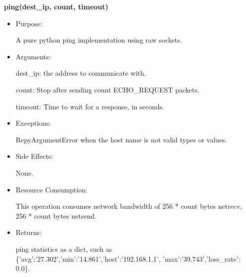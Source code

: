 \textbf{ping(dest\_ip, count, timeout)}
\begin{itemize}
\item Purpose:

A pure python ping implementation using raw sockets.

\item Arguments:

dest\_ip: the address to communicate with.

count: Stop after sending count ECHO\_REQUEST packets.

timeout: Time to wait for a response, in seconds.

\item Exceptions:

RepyArgumentError when the host name is not valid types or values.

\item Side Effects:

None.

\item Resource Consumption:

This operation consumes network bandwidth of 256 * count bytes netrecv, 256 * count bytes netsend.

\item Returns:

ping statistics as a dict, such as \{'avg':'27.302','min':'14.861','host':'192.168.1.1',
'max':'39.743','loss\_rate': 0.0\}.
\end{itemize}